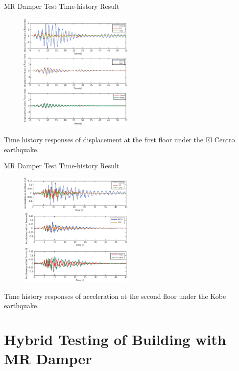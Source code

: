 \documentclass[usepdftitle=false]{beamer}
\begin{document}
\begin{frame}{MR Damper Test Time-history Result}
\begin{figure}[!ht]
\centering
\includegraphics[width=0.5\textwidth] {figure/n3-16.eps}
\label{fig:n3-16}
\end{figure}
Time history responses of displacement at the first floor under the El Centro earthquake.
\end{frame}

\begin{frame}{MR Damper Test Time-history Result}
\begin{figure}[!ht]
\centering
\includegraphics[width=0.5\textwidth] {figure/n3-17.eps}
\end{figure}
Time history responses of acceleration at the second floor under the Kobe earthquake.
\label{fig:n3-17}
\end{frame}






\section{Hybrid Testing of Building with MR Damper}
\end{document}
